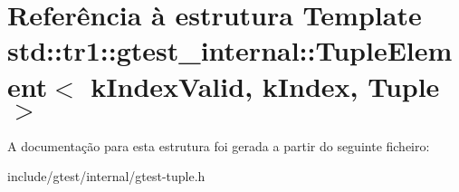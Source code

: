 \hypertarget{structstd_1_1tr1_1_1gtest__internal_1_1TupleElement}{\section{Referência à estrutura Template std\-:\-:tr1\-:\-:gtest\-\_\-internal\-:\-:Tuple\-Element$<$ k\-Index\-Valid, k\-Index, Tuple $>$}
\label{structstd_1_1tr1_1_1gtest__internal_1_1TupleElement}
}


A documentação para esta estrutura foi gerada a partir do seguinte ficheiro\-:\begin{DoxyCompactItemize}
\item 
include/gtest/internal/gtest-\/tuple.\-h\end{DoxyCompactItemize}
